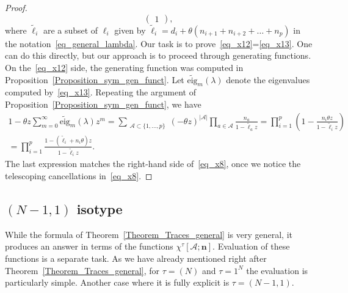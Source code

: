 \begin{proof}
\begin{equation}
\begin{pmatrix}
1
\end{pmatrix},
\end{equation}
where $\tilde \ell_i$ are a subset of $\ell_i$ given by $\tilde \ell_i= d_i + \theta (n_{i+1}+n_{i+2}+\dots+n_p)$
in the notation~\eqref{eq_general_lambda}. Our task is to prove~\eqref{eq_x12}=\eqref{eq_x13}. One can do this directly, but our approach is to proceed
through generating functions. On the~\eqref{eq_x12} side, the generating function was computed in Proposition~\ref{Proposition_sym_gen_funct}. Let $\widetilde{\mathrm{eig}}_m(\lambda)$ denote the eigenvalues computed by~\eqref{eq_x13}. Repeating the argument of Proposition~\ref{Proposition_sym_gen_funct}, we have
\begin{multline*}
 1-\theta z \sum_{m=0}^{\infty}  \widetilde{\mathrm{eig}}_m(\lambda) z^m =
  \sum_{\begin{smallmatrix} \mathcal A\subset \{1,\dots,p\} \end{smallmatrix}}  (-\theta z)^{|\mathcal A|}
   \prod_{a\in \mathcal A} \frac{n_a}{1-\tilde \ell_{a}z}=\prod_{i=1}^p\left(1-\frac{n_i \theta z}{1-\tilde \ell_i z}\right)\\=\prod_{i=1}^p\frac{1-(\tilde \ell_i+n_i \theta) z}{1-\tilde \ell_i z}.
\end{multline*}
The last expression matches the right-hand side of~\eqref{eq_x8}, once we notice the telescoping cancellations in~\eqref{eq_x8}.
\end{proof}

\subsection{\texorpdfstring{$(N-1,1)$}{(N-1,1)} isotype}

While the formula of Theorem~\ref{Theorem_Traces_general} is very general, it produces an answer in terms of the functions $\chi^\tau[\mathcal A; \mathbf n]$. Evaluation of these functions is a separate task. As we have already mentioned right after Theorem~\ref{Theorem_Traces_general}, for $\tau=(N)$ and $\tau=1^N$ the evaluation is particularly simple. Another case where it is fully explicit is $\tau=(N-1,1)$.

